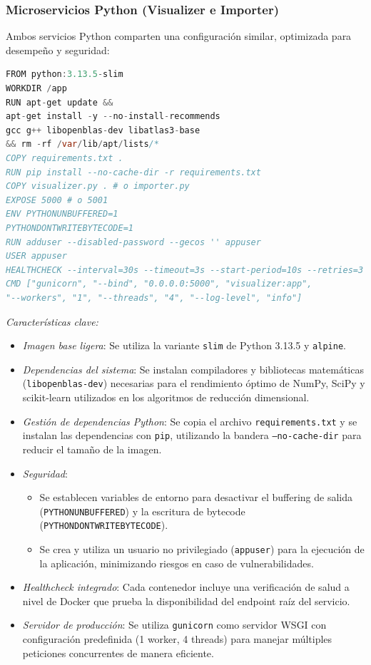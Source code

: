 \documentclass{article}
\begin{document}
\subsubsection{Microservicios Python (Visualizer e Importer)}
Ambos servicios Python comparten una configuración similar, optimizada para desempeño y seguridad:
\begin{lstlisting}[language=java, basicstyle=\small\ttfamily]
FROM python:3.13.5-slim
WORKDIR /app
RUN apt-get update &&
apt-get install -y --no-install-recommends
gcc g++ libopenblas-dev libatlas3-base
&& rm -rf /var/lib/apt/lists/*
COPY requirements.txt .
RUN pip install --no-cache-dir -r requirements.txt
COPY visualizer.py . # o importer.py
EXPOSE 5000 # o 5001
ENV PYTHONUNBUFFERED=1
PYTHONDONTWRITEBYTECODE=1
RUN adduser --disabled-password --gecos '' appuser
USER appuser
HEALTHCHECK --interval=30s --timeout=3s --start-period=10s --retries=3
CMD ["gunicorn", "--bind", "0.0.0.0:5000", "visualizer:app",
"--workers", "1", "--threads", "4", "--log-level", "info"]
\end{lstlisting}
\textit{Características clave:}
\begin{itemize}
\item \textit{Imagen base ligera}: Se utiliza la variante \texttt{slim} de Python 3.13.5 y \texttt{alpine}.
\item \textit{Dependencias del sistema}: Se instalan compiladores y bibliotecas matemáticas (\texttt{libopenblas-dev}) necesarias para el rendimiento óptimo de NumPy, SciPy y scikit-learn utilizados en los algoritmos de reducción dimensional.
\item \textit{Gestión de dependencias Python}: Se copia el archivo \texttt{requirements.txt} y se instalan las dependencias con \texttt{pip}, utilizando la bandera \texttt{--no-cache-dir} para reducir el tamaño de la imagen.
\item \textit{Seguridad}:
\begin{itemize}
\item Se establecen variables de entorno para desactivar el buffering de salida (\texttt{PYTHONUNBUFFERED}) y la escritura de bytecode (\texttt{PYTHONDONTWRITEBYTECODE}).
\item Se crea y utiliza un usuario no privilegiado (\texttt{appuser}) para la ejecución de la aplicación, minimizando riesgos en caso de vulnerabilidades.
\end{itemize}
\item \textit{Healthcheck integrado}: Cada contenedor incluye una verificación de salud a nivel de Docker que prueba la disponibilidad del endpoint raíz del servicio.
\item \textit{Servidor de producción}: Se utiliza \texttt{gunicorn} como servidor WSGI con configuración predefinida (1 worker, 4 threads) para manejar múltiples peticiones concurrentes de manera eficiente.
\end{itemize}
\end{document}
